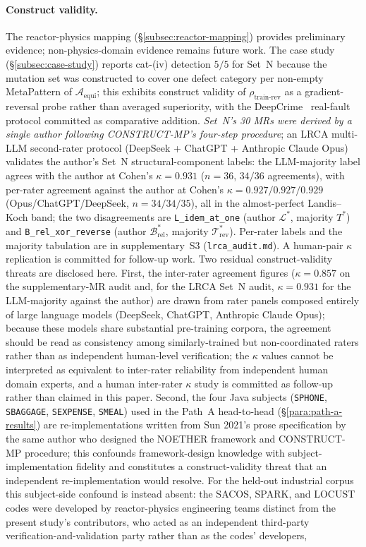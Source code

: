 \documentclass[acmsmall,screen,review]{acmart}
\begin{document}
\paragraph{Construct validity.} The reactor-physics mapping (\S\ref{subsec:reactor-mapping}) provides preliminary evidence; non-physics-domain evidence remains future work. The case study (\S\ref{subsec:case-study}) reports cat-(iv) detection $5/5$ for Set~N because the mutation set was constructed to cover one defect category per non-empty MetaPattern of $\mathcal{A}_{\mathrm{equi}}$; this exhibits construct validity of $\rho_{\mathrm{train\text{-}rev}}$ as a gradient-reversal probe rather than averaged superiority, with the DeepCrime~\cite{Humbatova2021DeepCrime} real-fault protocol committed as comparative addition. \emph{Set~N's 30 MRs were derived by a single author following CONSTRUCT-MP's four-step procedure}; an LRCA multi-LLM second-rater protocol (DeepSeek + ChatGPT + Anthropic Claude Opus) validates the author's Set~N structural-component labels: the LLM-majority label agrees with the author at Cohen's $\kappa = 0.931$ ($n = 36$, $34/36$ agreements), with per-rater agreement against the author at Cohen's $\kappa = 0.927/0.927/0.929$ (Opus/ChatGPT/DeepSeek, $n = 34/34/35$), all in the almost-perfect Landis--Koch band; the two disagreements are \texttt{L\_idem\_at\_one} (author $\mathcal{L}^{*}$, majority $T^{*}$) and \texttt{B\_rel\_xor\_reverse} (author $\mathcal{B}^{*}_{\mathrm{rel}}$, majority $\mathcal{T}^{*}_{\mathrm{rev}}$). Per-rater labels and the majority tabulation are in supplementary~S3 (\texttt{lrca\_audit.md}). A human-pair $\kappa$ replication is committed for follow-up work. Two residual construct-validity threats are disclosed here. First, the inter-rater agreement figures ($\kappa = 0.857$ on the supplementary-MR audit and, for the LRCA Set~N audit, $\kappa = 0.931$ for the LLM-majority against the author) are drawn from rater panels composed entirely of large language models (DeepSeek, ChatGPT, Anthropic Claude Opus); because these models share substantial pre-training corpora, the agreement should be read as consistency among similarly-trained but non-coordinated raters rather than as independent human-level verification; the $\kappa$ values cannot be interpreted as equivalent to inter-rater reliability from independent human domain experts, and a human inter-rater $\kappa$ study is committed as follow-up rather than claimed in this paper. Second, the four Java subjects (\texttt{SPHONE}, \texttt{SBAGGAGE}, \texttt{SEXPENSE}, \texttt{SMEAL}) used in the Path~A head-to-head (\S\ref{para:path-a-results}) are re-implementations written from Sun 2021's prose specification by the same author who designed the NOETHER framework and CONSTRUCT-MP procedure; this confounds framework-design knowledge with subject-implementation fidelity and constitutes a construct-validity threat that an independent re-implementation would resolve. For the held-out industrial corpus this subject-side confound is instead absent: the SACOS, SPARK, and LOCUST codes were developed by reactor-physics engineering teams distinct from the present study's contributors, who acted as an independent third-party verification-and-validation party rather than as the codes' developers, 
\end{document}
